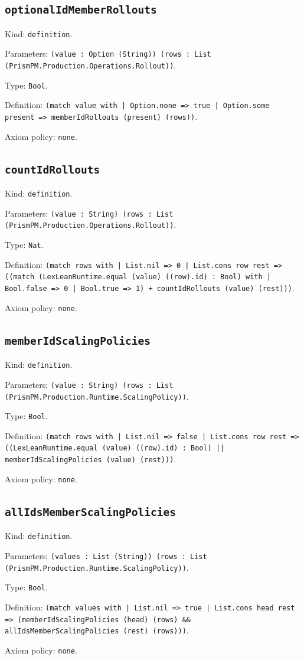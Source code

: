 \documentclass[11pt]{article}
\begin{document}
\subsection*{\texttt{optionalIdMemberRollouts}}
\noindent Kind: \texttt{definition}.\par
\noindent Parameters: \texttt{(value : Option (String)) (rows : List (PrismPM.Production.Operations.Rollout))}.\par
\noindent Type: \texttt{Bool}.\par
\noindent Definition: \texttt{(match value with | Option.none => true | Option.some present => memberIdRollouts (present) (rows))}.\par
\noindent Axiom policy: \texttt{none}.\par
\subsection*{\texttt{countIdRollouts}}
\noindent Kind: \texttt{definition}.\par
\noindent Parameters: \texttt{(value : String) (rows : List (PrismPM.Production.Operations.Rollout))}.\par
\noindent Type: \texttt{Nat}.\par
\noindent Definition: \texttt{(match rows with | List.nil => 0 | List.cons row rest => ((match (LexLeanRuntime.equal (value) ((row).id) : Bool) with | Bool.false => 0 | Bool.true => 1) + countIdRollouts (value) (rest)))}.\par
\noindent Axiom policy: \texttt{none}.\par
\subsection*{\texttt{memberIdScalingPolicies}}
\noindent Kind: \texttt{definition}.\par
\noindent Parameters: \texttt{(value : String) (rows : List (PrismPM.Production.Runtime.ScalingPolicy))}.\par
\noindent Type: \texttt{Bool}.\par
\noindent Definition: \texttt{(match rows with | List.nil => false | List.cons row rest => ((LexLeanRuntime.equal (value) ((row).id) : Bool) || memberIdScalingPolicies (value) (rest)))}.\par
\noindent Axiom policy: \texttt{none}.\par
\subsection*{\texttt{allIdsMemberScalingPolicies}}
\noindent Kind: \texttt{definition}.\par
\noindent Parameters: \texttt{(values : List (String)) (rows : List (PrismPM.Production.Runtime.ScalingPolicy))}.\par
\noindent Type: \texttt{Bool}.\par
\noindent Definition: \texttt{(match values with | List.nil => true | List.cons head rest => (memberIdScalingPolicies (head) (rows) \&\& allIdsMemberScalingPolicies (rest) (rows)))}.\par
\noindent Axiom policy: \texttt{none}.\par
\end{document}
